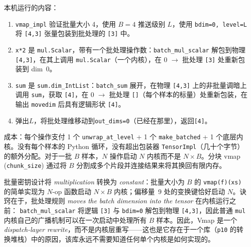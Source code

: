 本机运行的内容：
\begin{enumerate}[leftmargin=1.2em]
\item \texttt{vmap\_impl} 验证批量大小 4，使用 $B{=}4$ 推送级别 $L$，使用 \texttt{bdim=0, level=L} 将 \texttt{[4,3]} 张量包装到批处理的 \texttt{[3]} 中。
\item \texttt{x*2} 是 \texttt{mul.Scalar}，带有一个批处理操作数：\texttt{batch\_mul\_scalar} 解包到物理 \texttt{[4,3]}，在其上调用 \texttt{mul.Scalar}（一个内核），在 0 $\to$ 批处理 \texttt{[3]} 处重新包装到 dim~0。
\item \texttt{sum} 是 \texttt{sum.dim\_IntList}：\texttt{batch\_sum} 展开，在物理 \texttt{[4,3]} 上的非批量调暗上调用 \texttt{sum}，获取 \texttt{[4]}，在 0 $\to$ 批处理 \texttt{[]}（每个样本的标量）处重新包装，在输出 \texttt{movedim} 后具有逻辑形状 \texttt{[4]}。
\item 弹出$L$，将批处理维移动到\texttt{out\_dims=0}（已经在那里），返回\texttt{[4]}。
\end{enumerate}

成本：每个操作支付 1 个 \texttt{unwrap\_at\_level} + 1 个 \texttt{make\_batched} + 1 个底层内核。没有每个样本的 Python 循环，没有超出包装器 \texttt{TensorImpl}（几十个字节）的额外分配。对于一批 $B$ 样本，$N$ 操作启动 $N$ 内核而不是 $N{\times}B$。分块 vmap (\texttt{chunk\_size}) 通过将 $B$ 分割成多个片段并连接结果来将其换回有限内存。

\begin{tpinsight}
批量密钥设计将 \emph{multiplication} 转换为 \emph{constant}：批量大小为 $B$ 的 \texttt{vmap(f)(xs)} 的简单实现为 $N$-op 函数启动 $N{\times}B$ 内核；偏移量~9 处的变换键恰好启动 $N$。诀窍在于，批处理规则 \emph{moves the batch dimension into the tensor} 在内核运行之前： \texttt{batch\_mul\_scalar} 将逻辑 \texttt{[3]} 与 \texttt{bdim=0} 解包到物理 \texttt{[4,3]}，因此普通 \texttt{mul} 内核自己的广播机制可以在一次启动中处理所有 $B$ 样本。因此，Vmap 是一个 \emph{dispatch-layer rewrite}，而不是内核层重写——这也是它存在于一个库（\texttt{p10} 的转换堆栈）中的原因，该库永远不需要知道任何单个内核是如何实现的。
\end{tpinsight}


